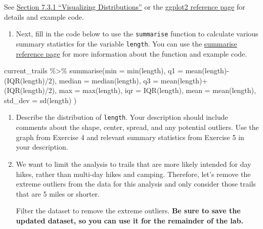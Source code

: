 \documentclass[
]{article}
\newenvironment{Shaded}{\begin{snugshade}}{\end{snugshade}}
\newcommand{\AttributeTok}[1]{\textcolor[rgb]{0.77,0.63,0.00}{#1}}
\newcommand{\DecValTok}[1]{\textcolor[rgb]{0.00,0.00,0.81}{#1}}
\newcommand{\FunctionTok}[1]{\textcolor[rgb]{0.00,0.00,0.00}{#1}}
\newcommand{\NormalTok}[1]{#1}
\newcommand{\SpecialCharTok}[1]{\textcolor[rgb]{0.00,0.00,0.00}{#1}}
\providecommand{\tightlist}{%
  \setlength{\itemsep}{0pt}\setlength{\parskip}{0pt}}
\begin{document}
See
\href{https://r4ds.had.co.nz/exploratory-data-analysis.html\#introduction-3}{Section
7.3.1 ``Visualizing Distributions''} or the
\href{https://ggplot2.tidyverse.org/reference/index.html}{ggplot2
reference page} for details and example code.

\begin{enumerate}
\def\labelenumi{\arabic{enumi}.}
\setcounter{enumi}{4}
\tightlist
\item
  Next, fill in the code below to use the \texttt{summarise} function to
  calculate various summary statistics for the variable \texttt{length}.
  You can use the
  \href{https://dplyr.tidyverse.org/reference/summarise.html}{summarise
  reference page} for more information about the function and example
  code.
\end{enumerate}

\begin{Shaded}
\begin{Highlighting}[]
\NormalTok{current\_trails }\SpecialCharTok{\%\textgreater{}\%}
  \FunctionTok{summarise}\NormalTok{(}\AttributeTok{min =} \FunctionTok{min}\NormalTok{(length), }
            \AttributeTok{q1 =} \FunctionTok{mean}\NormalTok{(length)}\SpecialCharTok{{-}}\NormalTok{(}\FunctionTok{IQR}\NormalTok{(length)}\SpecialCharTok{/}\DecValTok{2}\NormalTok{), }
            \AttributeTok{median =} \FunctionTok{median}\NormalTok{(length), }
            \AttributeTok{q3 =} \FunctionTok{mean}\NormalTok{(length)}\SpecialCharTok{+}\NormalTok{(}\FunctionTok{IQR}\NormalTok{(length)}\SpecialCharTok{/}\DecValTok{2}\NormalTok{), }
            \AttributeTok{max =} \FunctionTok{max}\NormalTok{(length), }
            \AttributeTok{iqr =} \FunctionTok{IQR}\NormalTok{(length), }
            \AttributeTok{mean =} \FunctionTok{mean}\NormalTok{(length), }
            \AttributeTok{std\_dev =} \FunctionTok{sd}\NormalTok{(length)}
\NormalTok{            )}
\end{Highlighting}
\end{Shaded}

\begin{enumerate}
\def\labelenumi{\arabic{enumi}.}
\setcounter{enumi}{5}
\item
  Describe the distribution of \texttt{length}. Your description should
  include comments about the shape, center, spread, and any potential
  outliers. Use the graph from Exercise 4 and relevant summary
  statistics from Exercise 5 in your description.
\item
  We want to limit the analysis to trails that are more likely intended
  for day hikes, rather than multi-day hikes and camping. Therefore,
  let's remove the extreme outliers from the data for this analysis and
  only consider those trails that are 5 miles or shorter.

  Filter the dataset to remove the extreme outliers. \textbf{Be sure to
  save the updated dataset, so you can use it for the remainder of the
  lab.}
\end{enumerate}
\end{document}
